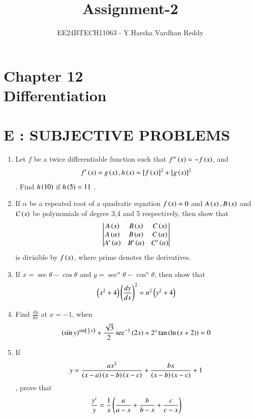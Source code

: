 \documentclass[journal,,12pt,onecolumn]{IEEEtran}
\theoremstyle{remark}
\begin{document}
    
    
    
   \title{Assignment-2}
\author{EE24BTECH11063 - Y.Harsha Vardhan Reddy}
\maketitle
\newpage
\bigskip

\renewcommand{\thefigure}{\theenumi}
\renewcommand{\thetable}{\theenumi}
\section*{Chapter 12\\Differentiation}



\section*{E : SUBJECTIVE PROBLEMS}
\begin{enumerate}
\item Let $f$ be a twice differentiable function such that 
$f''\left(x\right)=-f\left(x\right)$, and \begin{align}f'\left(x\right)=g\left(x\right) , h\left(x\right)=[f\left(x\right)]^2+[g\left(x\right)]^2\end{align}. Find $h\left(10\right)$ if $h\left(5\right)=11$ .
\hfill{}
\item If $\alpha$ be a repeated root of a quadratic equation $f\left(x\right)=0$ and $A\left(x\right),B\left(x\right)$ and $C\left(x\right)$ be polynomials of degree 3,4 and 5 respectively, then show that \begin{align}\begin{vmatrix}
A\left(x\right) & B\left(x\right) & C\left(x\right) \\
A\left(\alpha\right) & B\left(\alpha\right) & C\left(\alpha\right) \\
A'\left(\alpha\right) & B'\left(\alpha\right) & C'\left(\alpha\right) 
\end{vmatrix} \end{align}
is divisible by $f\left(x\right)$, where prime denotes the derivatives.
\hfill{}
\item If $x=\sec{\theta}-\cos{\theta}$ and $y=\sec^n{\theta}-\cos^n{\theta}$, then show that \begin{align} \left(x^2 + 4\right) \left(\frac{dy}{dx}\right)^2=n^2 \left(y^2+4\right) \end{align}
\hfill{}
\item Find $\frac{dy}{dx}$ at $x=-1$, when \begin{align}\left(\sin{y}\right)^{\sin\left(\frac{\pi}{2}x\right)} + \frac{\sqrt{3}}{2}\sec^{-1}{(2x)} + 2^x\tan{\ensuremath{\left(\ln{\ensuremath{\left(x+2\right)}}\right)}} = 0 \end{align}
\hfill{}
\item If \begin{align}y = \frac{ax^2}{\left(x-a\right)\left(x-b\right)\left(x-c\right)}+\frac{bx}{\left(x-b\right)\left(x-c\right)}+1\end{align}, prove that \begin{align}\frac{y'}{y}=\frac{1}{x}\left(\frac{a}{a-x}+\frac{b}{b-x}+\frac{c}{c-x}\right)\end{align}
\hfill{}
\end{enumerate}
\end{document}
